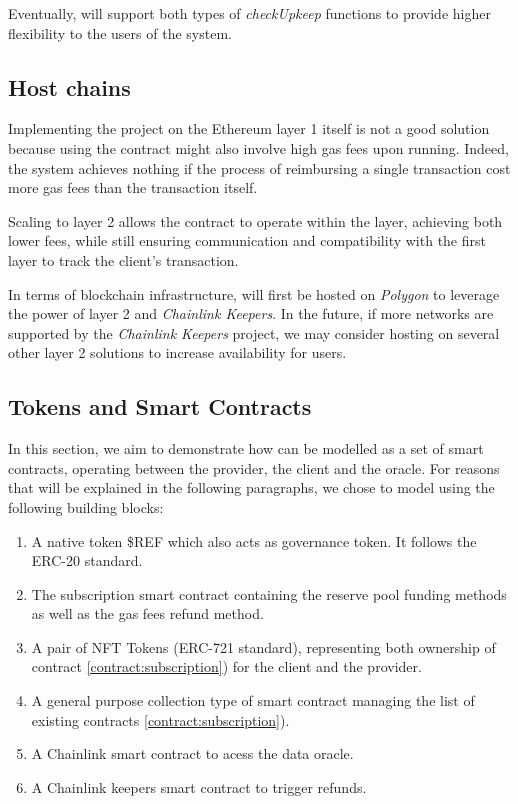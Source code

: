 Eventually, {\projectName} will support both types of \textit{checkUpkeep} functions to provide higher flexibility to the users of the system.


\subsection{Host chains} \label{section:host-chains}
Implementing the project on the Ethereum layer 1 itself is not a good solution because using the contract might also involve high gas fees upon running. Indeed, the system achieves nothing if the process of reimbursing a single transaction cost more gas fees than the transaction itself. 

Scaling \projectName to layer 2 allows the contract to operate within the layer, achieving both lower fees, while still ensuring communication and compatibility with the first layer to track the client's transaction.

In terms of blockchain infrastructure, {\projectName} will first be hosted on \textit{Polygon} to leverage the power of layer 2 and \textit{Chainlink Keepers}. In the future, if more networks are supported by the \textit{Chainlink Keepers} project, we may consider hosting {\projectName}  on several other layer 2 solutions to increase availability for users.


\subsection{{\projectName} Tokens and Smart Contracts} \label{section:tokens}

In this section, we aim to demonstrate how {\projectName} can be modelled as a set of smart contracts, operating between the provider, the client and the oracle. For reasons that will be explained in the following paragraphs, we chose to model {\projectName} using the following building blocks: 
\begin{enumerate}
    \item A native token \$REF which also acts as governance token. It follows the ERC-20 standard.
    \item \label{contract:subscription} The {\projectName} subscription smart contract containing the reserve pool funding methods as well as the gas fees refund method.
    \item A pair of NFT Tokens (ERC-721 standard), representing both ownership of contract \ref{contract:subscription}) for the client and the provider.
    \item A general purpose collection type of smart contract managing the list of existing contracts \ref{contract:subscription}).
    \item A Chainlink smart contract to acess the data oracle.
    \item A Chainlink keepers smart contract to trigger refunds.
\end{enumerate}


